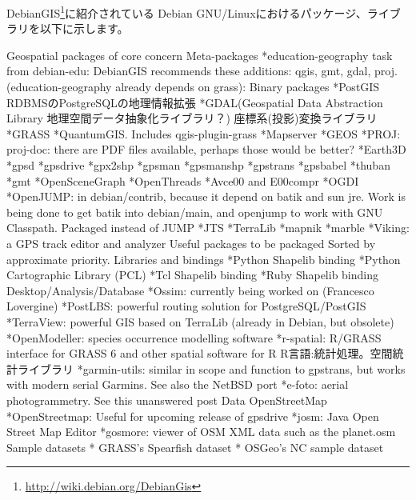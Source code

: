 \documentclass[mingoth,a4paper]{jsarticle}
\begin{document}
DebianGIS\footnote{\url{http://wiki.debian.org/DebianGis}}に紹介されている
Debian GNU/Linuxにおけるパッケージ、ライブラリを以下に示します。
\begin{commandline}
Geospatial packages of core concern
    Meta-packages
        *education-geography task from debian-edu: DebianGIS recommends these additions: qgis, gmt, gdal, proj.
 (education-geography already depends on grass):
    Binary packages
        *PostGIS
            RDBMSのPostgreSQLの地理情報拡張
        *GDAL(Geospatial Data Abstraction Library 地理空間データ抽象化ライブラリ？)
            座標系(投影)変換ライブラリ
        *GRASS
        *QuantumGIS. Includes qgis-plugin-grass
        *Mapserver
        *GEOS
        *PROJ: proj-doc: there are PDF files available, perhaps those would be better?
        *Earth3D
        *gpsd
        *gpsdrive
        *gpx2shp
        *gpsman
        *gpsmanshp
        *gpstrans
        *gpsbabel
        *thuban
        *gmt
        *OpenSceneGraph
        *OpenThreads
        *Avce00 and E00compr
        *OGDI
        *OpenJUMP: in debian/contrib, because it depend on batik and sun jre. Work is being done to get batik into 
debian/main, and openjump to work with GNU Classpath. Packaged instead of JUMP
        *JTS
        *TerraLib
        *mapnik
        *marble
        *Viking: a GPS track editor and analyzer
        Useful packages to be packaged
        Sorted by approximate priority.
            Libraries and bindings
            *Python Shapelib binding
            *Python Cartographic Library (PCL)
            *Tcl Shapelib binding
            *Ruby Shapelib binding
        Desktop/Analysis/Database
            *Ossim: currently being worked on (Francesco Lovergine)
            *PostLBS: powerful routing solution for PostgreSQL/PostGIS
            *TerraView: powerful GIS based on TerraLib (already in Debian, but obsolete)
            *OpenModeller: species occurrence modelling software
            *r-spatial: R/GRASS interface for GRASS 6 and other spatial software for R
                R言語:統計処理。空間統計ライブラリ
            *garmin-utils: similar in scope and function to gpstrans, but works with modern serial Garmins. 
See also the NetBSD port
            *e-foto: aerial photogrammetry. See this unanswered post
        Data
        OpenStreetMap
            *OpenStreetmap: Useful for upcoming release of gpsdrive
            *josm: Java Open Street Map Editor
            *gosmore: viewer of OSM XML data such as the planet.osm
        Sample datasets
            * GRASS's Spearfish dataset
            * OSGeo's NC sample dataset
\end{commandline}
\end{document}
